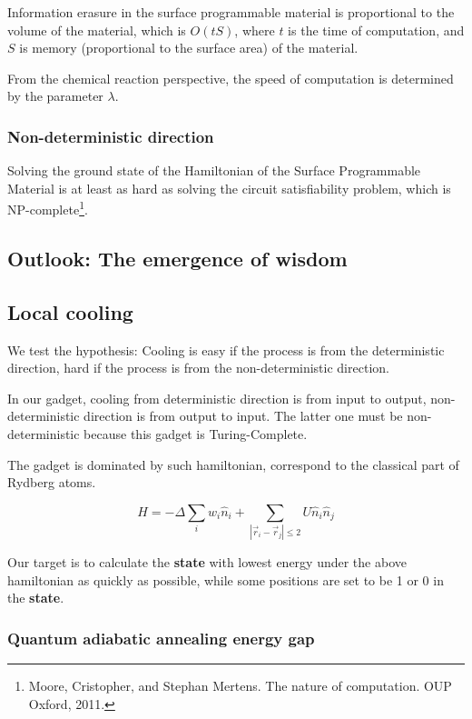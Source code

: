 \documentclass[twocolumn,superscriptaddress,english,showpacs,longbibliography]{revtex4-2}
\begin{document}
Information erasure in the surface programmable material is proportional
to the volume of the material, which is $O(tS)$, where $t$ is the
time of computation, and $S$ is memory (proportional to the surface
area) of the material.

From the chemical reaction perspective, the speed of computation is
determined by the parameter $\lambda$.

\subsubsection{Non-deterministic
direction}\label{non-deterministic-direction}

Solving the ground state of the Hamiltonian of the Surface Programmable
Material is at least as hard as solving the circuit satisfiability
problem, which is NP-complete\footnote{Moore, Cristopher, and Stephan
  Mertens. The nature of computation. OUP Oxford, 2011.}.

\subsection{Outlook: The emergence of
wisdom}\label{outlook-the-emergence-of-wisdom}

\subsection{Local cooling}\label{local-cooling}

We test the hypothesis: Cooling is easy if the process is from the
deterministic direction, hard if the process is from the
non-deterministic direction.

In our gadget, cooling from deterministic direction is from input to
output, non-deterministic direction is from output to input. The latter
one must be non-deterministic because this gadget is Turing-Complete.

The gadget is dominated by such hamiltonian, correspond to the classical
part of Rydberg atoms.

\[
H = -\Delta \sum_i w_i \hat n_i + \sum_{|\vec r_i - \vec r_j|\leq 2} U \hat n_i \hat n_j
\]

Our target is to calculate the \textbf{state} with lowest energy under
the above hamiltonian as quickly as possible, while some positions are
set to be 1 or 0 in the \textbf{state}.

\subsubsection{Quantum adiabatic annealing energy
gap}\label{quantum-adiabatic-annealing-energy-gap}
\end{document}
